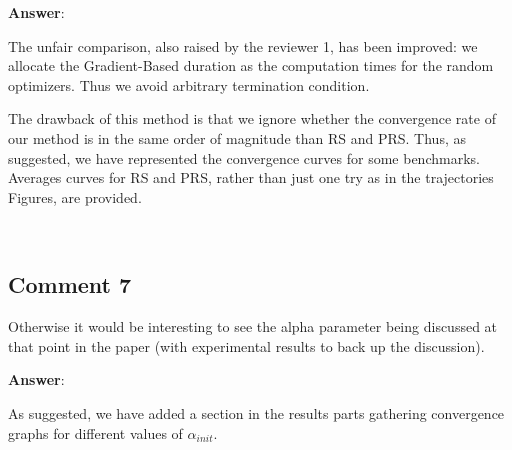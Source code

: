 \documentclass{scrartcl}
\begin{document}
\vspace{0.5cm}

\textbf{Answer}:

The unfair comparison, also raised by the reviewer 1, has been improved: we allocate the Gradient-Based duration as the computation times for the random optimizers. Thus we avoid arbitrary termination condition.

The drawback of this method is that we ignore whether the convergence rate of our method is in the same order of magnitude than RS and PRS. Thus, as suggested, we have represented the convergence curves for some benchmarks. Averages curves for RS and PRS, rather than just one try as in the trajectories Figures, are provided.

\noindent
\hrulefill\\

\subsection{Comment 7}

Otherwise it would be interesting to see the alpha parameter being discussed at that point in the paper (with experimental results to back up the discussion).

\vspace{0.5cm}

\textbf{Answer}:

As suggested, we have added a section in the results parts gathering convergence graphs for different values of $\alpha_{init}$.
\end{document}
